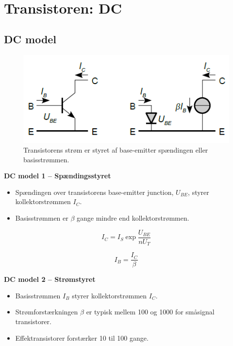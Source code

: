 \documentclass[danish]{article}
\begin{document}
\newpage
\section{Transistoren: DC}

\subsection{DC model}

\begin{figure} [H]
	\centering
	\includegraphics[width=0.8\linewidth]{graphics/transistor_DCmodel}
	\caption{Transistorens strøm er styret af base-emitter spændingen eller basisstrømmen.}
	\label{fig:transistor_DCmodel}
\end{figure}

\textbf{DC model 1 – Spændingsstyret}
\begin{itemize}
	\item Spændingen over transistorens base-emitter junction, $U_{BE}$, styrer kollektorstrømmen $I_C$.
	\item Basisstrømmen er ${\beta}$ gange mindre end kollektorstrømmen.
\end{itemize}

\begin{equation}
I_C = I_S \exp \dfrac{U_{BE}}{n U_T}
\end{equation}

\begin{equation}
I_B = \dfrac{I_C}{\beta}
\end{equation}

\textbf{DC model 2 – Strømstyret}
\begin{itemize}
	\item Basisstrømmen $I_B$ styrer kollektorstrømmen $I_C$.
	\item Strømforstærkningen ${\beta}$ er typisk mellem 100 og 1000 for småsignal transistorer.
	\item Effektransistorer forstærker 10 til 100 gange.
\end{itemize}
 
\end{document}
